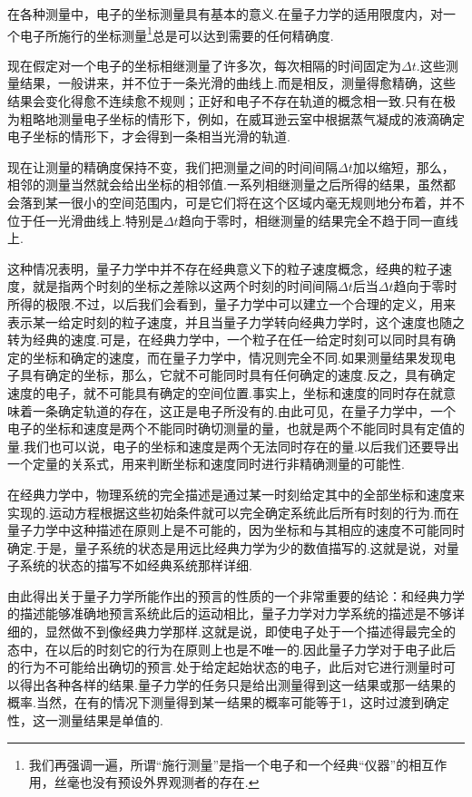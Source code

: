 在各种测量中，电子的坐标测量具有基本的意义.在量子力学的适用限度内，对一个电子所施行的坐标测量\footnote{我们再强调一遍，所谓“施行测量”是指一个电子和一个经典“仪器”的相互作用，丝毫也没有预设外界观测者的存在.}总是可以达到需要的任何精确度.

现在假定对一个电子的坐标相继测量了许多次，每次相隔的时间固定为$\Delta t$.这些测量结果，一般讲来，并不位于一条光滑的曲线上.而是相反，测量得愈精确，这些结果会变化得愈不连续愈不规则；正好和电子不存在轨道的概念相一致.只有在极为粗略地测量电子坐标的情形下，例如，在威耳逊云室中根据蒸气凝成的液滴确定电子坐标的情形下，才会得到一条相当光滑的轨道.

现在让测量的精确度保持不变，我们把测量之间的时间间隔$\Delta t$加以缩短，那么，相邻的测量当然就会给出坐标的相邻值.一系列相继测量之后所得的结果，虽然都会落到某一很小的空间范围内，可是它们将在这个区域内毫无规则地分布着，并不位于任一光滑曲线上.特别是$\Delta t$趋向于零时，相继测量的结果完全不趋于同一直线上.

这种情况表明，量子力学中并不存在经典意义下的粒子速度概念，经典的粒子速度，就是指两个时刻的坐标之差除以这两个时刻的时间间隔$\Delta t$后当$\Delta t$趋向于零时所得的极限.不过，以后我们会看到，量子力学中可以建立一个合理的定义，用来表示某一给定时刻的粒子速度，并且当量子力学转向经典力学时，这个速度也随之转为经典的速度.可是，在经典力学中，一个粒子在任一给定时刻可以同时具有确定的坐标和确定的速度，而在量子力学中，情况则完全不同.如果测量结果发现电子具有确定的坐标，那么，它就不可能同时具有任何确定的速度.反之，具有确定速度的电子，就不可能具有确定的空间位置.事实上，坐标和速度的同时存在就意味着一条确定轨道的存在，这正是电子所没有的.由此可见，在量子力学中，一个电子的坐标和速度是两个不能同时确切测量的量，也就是两个不能同时具有定值的量.我们也可以说，电子的坐标和速度是两个无法同时存在的量.以后我们还要导出一个定量的关系式，用来判断坐标和速度同时进行非精确测量的可能性.

在经典力学中，物理系统的完全描述是通过某一时刻给定其中的全部坐标和速度来实现的.运动方程根据这些初始条件就可以完全确定系统此后所有时刻的行为.而在量子力学中这种描述在原则上是不可能的，因为坐标和与其相应的速度不可能同时确定.于是，量子系统的状态是用远比经典力学为少的数值描写的.这就是说，对量子系统的状态的描写不如经典系统那样详细.

由此得出关于量子力学所能作出的预言的性质的一个非常重要的结论：和经典力学的描述能够准确地预言系统此后的运动相比，量子力学对力学系统的描述是不够详细的，显然做不到像经典力学那样.这就是说，即使电子处于一个描述得最完全的态中，在以后的时刻它的行为在原则上也是不唯一的.因此量子力学对于电子此后的行为不可能给出确切的预言.处于给定起始状态的电子，此后对它进行测量时可以得出各种各样的结果.量子力学的任务只是给出测量得到这一结果或那一结果的概率.当然，在有的情况下测量得到某一结果的概率可能等于1，这时过渡到确定性，这一测量结果是单值的.

